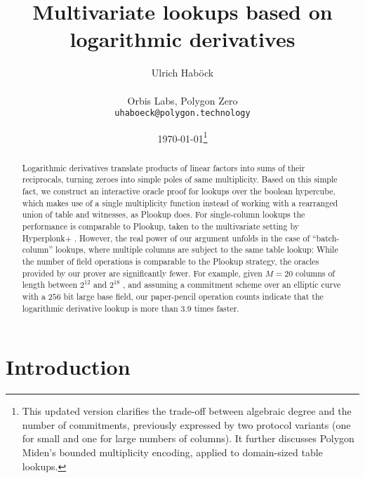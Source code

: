 \documentclass[11pt]{article}
\author{%
Ulrich Hab{\"o}ck
\\\\
Orbis Labs, Polygon Zero
\\
\texttt{uhaboeck@polygon.technology}
}
\theoremstyle{definition}
\theoremstyle{definition}
\begin{document}
\title{%
Multivariate lookups based on
logarithmic derivatives
}
\date{%
\today\footnote{%
This updated version clarifies the trade-off between algebraic degree and the number of commitments, previously expressed by two protocol variants (one for small and one for large numbers of columns).
It further discusses Polygon Miden's bounded multiplicity encoding, applied to domain-sized table lookups.
}
}
\maketitle

\begin{abstract}
Logarithmic derivatives translate products of linear factors into sums of their reciprocals, turning zeroes into simple poles of same multiplicity.
Based on this simple fact, we construct an interactive oracle proof for lookups over the boolean hypercube, which makes use of a single multiplicity function instead of working with a rearranged union of table and witnesses, as Plookup \cite{Plookup} does.
For single-column lookups the performance is comparable to Plookup, taken to the multivariate setting by Hyperplonk+ \cite{Hyperplonk}.
However, the real power of our argument unfolds in the case of ``batch-column'' lookups, where multiple columns are subject to the same table lookup:  
While the number of field operations is comparable to the Plookup strategy, the oracles provided by our prover are significantly fewer. 
For example, given $M=20$ columns of length between $2^{12}$ and $2^{18}$ , and assuming a commitment scheme over an elliptic curve with a $256$ bit large base field, our paper-pencil operation counts indicate that the logarithmic derivative lookup is more than $3.9$ times faster.
\end{abstract}


\tableofcontents

\section{Introduction}
\end{document}
